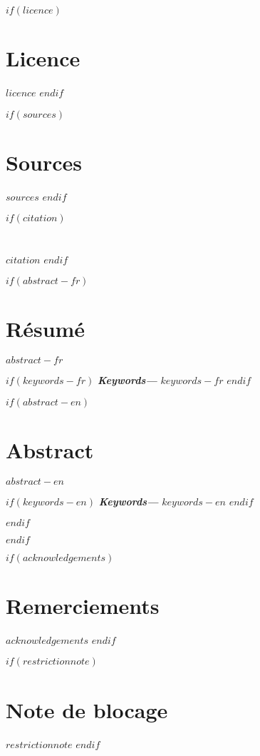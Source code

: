\renewcommand{\contentsname}{Table des matières}
\renewcommand{\figurename}{Illustration}
\renewcommand{\listfigurename}{Table des figures}

$if(licence)$
\chapter*{Licence}
$licence$
$endif$

$if(sources)$
\chapter*{Sources}
$sources$
$endif$

$if(citation)$
\chapter*{}
$citation$
$endif$

$if(abstract-fr)$
\cleardoublepage
\begin{minipage}{\linewidth}

\chapter*{Résumé}
\providecommand{\keywords}[1]{\textbf{\textit{Keywords---}} #1}
$abstract-fr$

\vspace*{1cm}

$if(keywords-fr)$
    \keywords{$keywords-fr$}
$endif$

$if(abstract-en)$
\chapter*{Abstract}
$abstract-en$

\vspace*{1cm}

$if(keywords-en)$
    \keywords{$keywords-en$}
$endif$

$endif$

\end{minipage}
\cleardoublepage
$endif$

$if(acknowledgements)$
\chapter*{Remerciements}
$acknowledgements$
$endif$

$if(restrictionnote)$
\chapter*{Note de blocage}
$restrictionnote$
$endif$

\cleardoublepage